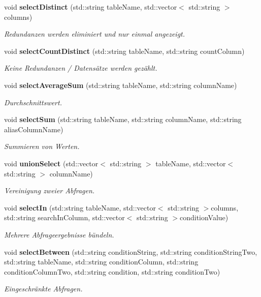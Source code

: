 \begin{DoxyCompactItemize}
void \textbf{ select\+Distinct} (std\+::string table\+Name, std\+::vector$<$ std\+::string $>$ columns)
\begin{DoxyCompactList}\small\item\em Redundanzen werden eliminiert und nur einmal angezeigt. \end{DoxyCompactList}\item 
void \textbf{ select\+Count\+Distinct} (std\+::string table\+Name, std\+::string count\+Column)
\begin{DoxyCompactList}\small\item\em Keine Redundanzen / Datensätze werden gezählt. \end{DoxyCompactList}\item 
void \textbf{ select\+Average\+Sum} (std\+::string table\+Name, std\+::string column\+Name)
\begin{DoxyCompactList}\small\item\em Durchschnittswert. \end{DoxyCompactList}\item 
void \textbf{ select\+Sum} (std\+::string table\+Name, std\+::string column\+Name, std\+::string alias\+Column\+Name)
\begin{DoxyCompactList}\small\item\em Summieren von Werten. \end{DoxyCompactList}\item 
void \textbf{ union\+Select} (std\+::vector$<$ std\+::string $>$ table\+Name, std\+::vector$<$ std\+::string $>$ column\+Name)
\begin{DoxyCompactList}\small\item\em Vereinigung zweier Abfragen. \end{DoxyCompactList}\item 
void \textbf{ select\+In} (std\+::string table\+Name, std\+::vector$<$ std\+::string $>$columns, std\+::string search\+In\+Column, std\+::vector$<$ std\+::string $>$condition\+Value)
\begin{DoxyCompactList}\small\item\em Mehrere Abfrageergebnisse bündeln. \end{DoxyCompactList}\item 
void \textbf{ select\+Between} (std\+::string condition\+String, std\+::string condition\+String\+Two, std\+::string table\+Name, std\+::string condition\+Column, std\+::string condition\+Column\+Two, std\+::string condition, std\+::string condition\+Two)
\begin{DoxyCompactList}\small\item\em Eingeschränkte Abfragen. \end{DoxyCompactList}\item 

\end{DoxyCompactItemize}
